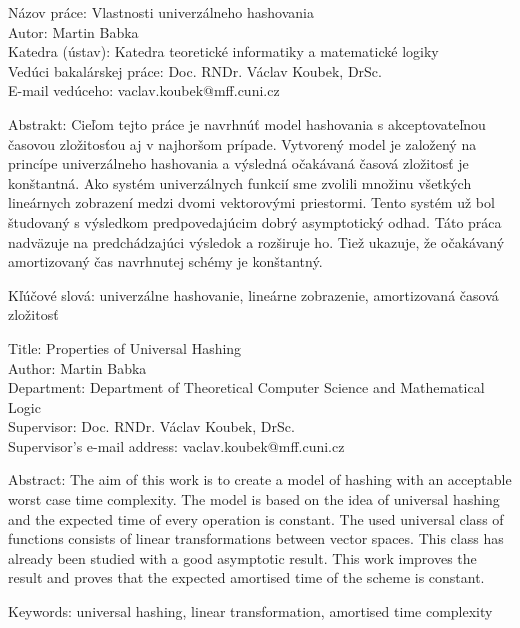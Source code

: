 \noindent
{}
\begin{flushleft}
Názov práce: Vlastnosti univerzálneho hashovania\\
Autor: Martin Babka\\
Katedra (ústav): Katedra teoretické informatiky a matematické logiky\\
Vedúci bakalárskej práce: Doc. RNDr. Václav Koubek, DrSc.\\
E-mail vedúceho: vaclav.koubek@mff.cuni.cz\\

\end{flushleft}
\noindent Abstrakt: Cieľom tejto práce je navrhnúť model hashovania s akceptovateľnou ča\-so\-vou zložitosťou aj v najhoršom prípade. Vytvorený model je založený na princípe univerzálneho hashovania a výsledná očakávaná časová zložitosť je konštantná. Ako systém univerzálnych funkcií sme zvolili množinu všetkých lineárnych zobrazení medzi dvomi vektorovými priestormi. Tento systém už bol študovaný s výsledkom predpovedajúcim dobrý asymptotický odhad. Táto práca nadväzuje na predchádzajúci výsledok a rozširuje ho. Tiež ukazuje, že očakávaný amortizovaný čas navrhnutej schémy je konštantný.
\begin{flushleft}
\noindent Kľúčové slová: univerzálne hashovanie, lineárne zobrazenie, amortizovaná časová zložitosť

\vspace{10mm}

\noindent
Title: Properties of Universal Hashing\\
Author: Martin Babka\\
Department: Department of Theoretical Computer Science and Mathematical Logic\\
Supervisor: Doc. RNDr. Václav Koubek, DrSc.\\
Supervisor's e-mail address: vaclav.koubek@mff.cuni.cz\\

\end{flushleft}
\noindent Abstract: The aim of this work is to create a model of hashing with an acceptable worst case time complexity. The model is based on the idea of universal hashing and the expected time of every operation is constant. The used universal class of functions consists of linear transformations between vector spaces. This class has already been studied with a good asymptotic result. This work improves the result and proves that the expected amortised time of the scheme is constant.
\begin{flushleft}
\noindent Keywords: universal hashing, linear transformation, amortised time complexity

\end{flushleft}
\newpage
